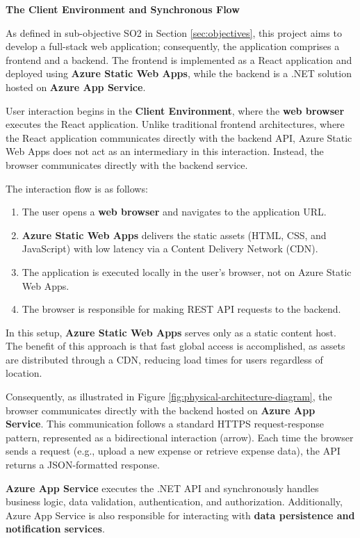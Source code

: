 \vspace{5.5cm}

\textbf{The Client Environment and Synchronous Flow}

As defined in sub-objective SO2 in Section \ref{sec:objectives}, this project aims to develop a full-stack web application; consequently, the application comprises a frontend and a backend. The frontend is implemented as a React application and deployed using \textbf{Azure Static Web Apps}, while the backend is a .NET solution hosted on \textbf{Azure App Service}.

User interaction begins in the \textbf{Client Environment}, where the \textbf{web browser} executes the React application. Unlike traditional frontend architectures, where the React application communicates directly with the backend API, Azure Static Web Apps does not act as an intermediary in this interaction. Instead, the browser communicates directly with the backend service.

The interaction flow is as follows:

\begin{enumerate} [leftmargin=0.75cm, noitemsep]
    \item The user opens a \textbf{web browser} and navigates to the application URL.
    \item \textbf{Azure Static Web Apps} delivers the static assets (HTML, CSS, and JavaScript) with low latency via a Content Delivery Network (CDN).
    \item The application is executed locally in the user's browser, not on Azure Static Web Apps.
    \item The browser is responsible for making REST API requests to the backend.
\end{enumerate}

In this setup, \textbf{Azure Static Web Apps} serves only as a static content host. The benefit of this approach is that fast global access is accomplished, as assets are distributed through a CDN, reducing load times for users regardless of location. 

Consequently, as illustrated in Figure \ref{fig:physical-architecture-diagram}, the browser communicates directly with the backend hosted on \textbf{Azure App Service}.  This communication follows a standard HTTPS request-response pattern, represented as a bidirectional interaction (arrow). Each time the browser sends a request (e.g., upload a new expense or retrieve expense data), the API returns a JSON-formatted response. 

\textbf{Azure App Service} executes the .NET API and synchronously handles business logic, data validation, authentication, and authorization. Additionally, Azure App Service is also responsible for interacting with \textbf{data persistence and notification services}.
